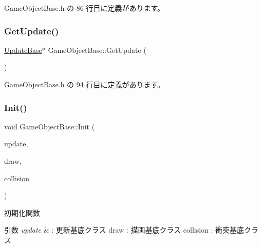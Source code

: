  Game\+Object\+Base.\+h の 86 行目に定義があります。

\mbox{\label{class_game_object_base_a177985be1be1252df6588fa29f2c7f41}} 
\subsubsection{\texorpdfstring{Get\+Update()}{GetUpdate()}}
{\footnotesize\ttfamily \mbox{\hyperlink{class_update_base}{Update\+Base}}$\ast$ Game\+Object\+Base\+::\+Get\+Update (\begin{DoxyParamCaption}{ }\end{DoxyParamCaption})\hspace{0.3cm}{\ttfamily [inline]}}



 Game\+Object\+Base.\+h の 94 行目に定義があります。

\mbox{\label{class_game_object_base_aca14cf5d66f945347653c4965876e75b}} 
\subsubsection{\texorpdfstring{Init()}{Init()}}
{\footnotesize\ttfamily void Game\+Object\+Base\+::\+Init (\begin{DoxyParamCaption}\item[{\mbox{\hyperlink{class_update_base}{Update\+Base}} $\ast$}]{update,  }\item[{\mbox{\hyperlink{class_draw_base}{Draw\+Base}} $\ast$}]{draw,  }\item[{\mbox{\hyperlink{class_collision_base}{Collision\+Base}} $\ast$}]{collision }\end{DoxyParamCaption})\hspace{0.3cm}{\ttfamily [protected]}}



初期化関数 


\begin{DoxyParams}{引数}
{\em update} & \+: 更新基底クラス draw \+: 描画基底クラス collision \+: 衝突基底クラス \\
\hline
\end{DoxyParams}


